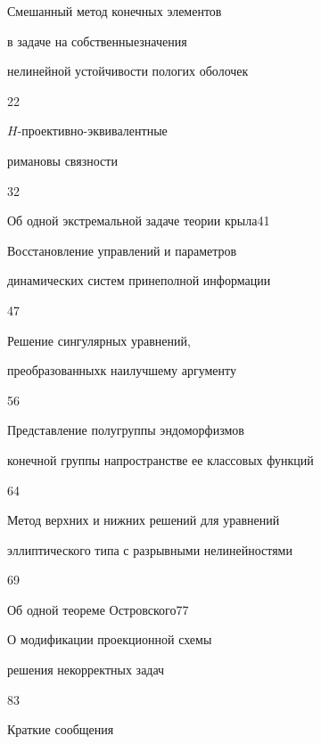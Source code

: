 

{Смешанный метод конечных элементов 


в задаче на собственные\newline значения 


нелинейной устойчивости пологих оболочек}{22}




{$H$-проективно-эквивалентные 


римановы связности}{32}




{Об одной экстремальной задаче теории крыла}{41}




{Восстановление управлений и параметров 


динамических систем при\newline неполной информации}{47}




{Решение сингулярных уравнений, 


преобразованных\newline к наилучшему аргументу}{56}




{Представление полугруппы эндоморфизмов 


конечной группы на\newline пространстве ее классовых функций}{64}




{Метод верхних и нижних решений для уравнений\newline


эллиптического типа с разрывными нелинейностями}{69}




{Об одной теореме Островского}{77}




{О модификации проекционной схемы 


решения некорректных задач}{83}








\bigskip


{\centerline {Краткие сообщения}}


\bigskip





